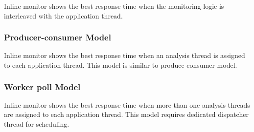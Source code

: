 Inline monitor shows the best response time when the monitoring logic is
interleaved with the application thread.

\subsubsection{Producer-consumer Model}

Inline monitor shows the best response time when an analysis thread is assigned
to each application thread. This model is similar to produce consumer model.

\subsubsection{Worker poll Model}

Inline monitor shows the best response time when more than one analysis threads
are assigned to each application thread. This model requires dedicated
dispatcher thread for scheduling.
